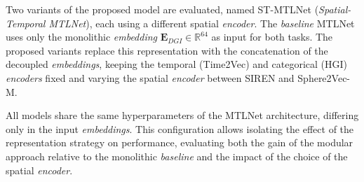 Two variants of the proposed model are evaluated, named ST-MTLNet (\textit{Spatial-Temporal MTLNet}), each using a different spatial \textit{encoder}. The \textit{baseline} MTLNet \cite{silva2025mtlnet} uses only the monolithic \textit{embedding} $\mathbf{E}_{DGI} \in \mathbb{R}^{64}$ as input for both tasks. The proposed variants replace this representation with the concatenation of the decoupled \textit{embeddings}, keeping the temporal (Time2Vec) and categorical (HGI) \textit{encoders} fixed and varying the spatial \textit{encoder} between SIREN and Sphere2Vec-M.

All models share the same hyperparameters of the MTLNet architecture, differing only in the input \textit{embeddings}. This configuration allows isolating the effect of the representation strategy on performance, evaluating both the gain of the modular approach relative to the monolithic \textit{baseline} and the impact of the choice of the spatial \textit{encoder}.